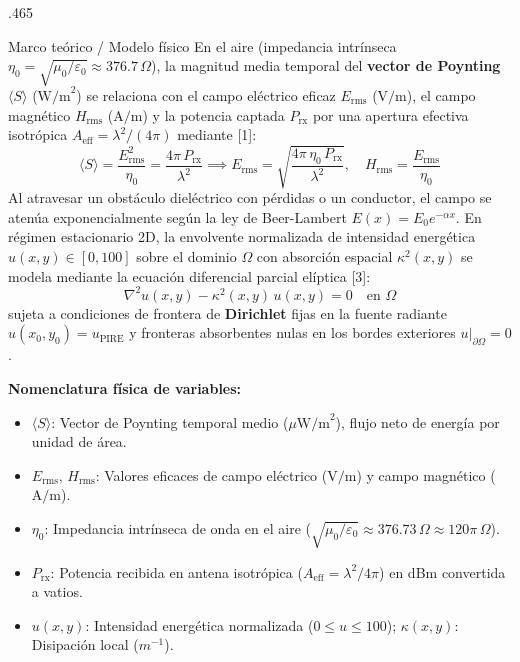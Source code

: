 \documentclass[final]{beamer}
\begin{document}
\begin{frame}[t]
\begin{columns}[t]
\begin{column}{.465\paperwidth}
				\begin{block}{Marco teórico / Modelo físico}
					En el aire (impedancia intrínseca \(\eta_0 = \sqrt{\mu_0/\varepsilon_0} \approx 376.7\,\Omega\)), la magnitud media temporal del \textbf{vector de Poynting} \(\langle S \rangle\) (\(\text{W/m}^2\)) se relaciona con el campo eléctrico eficaz \(E_{\text{rms}}\) (\(\text{V/m}\)), el campo magnético \(H_{\text{rms}}\) (\(\text{A/m}\)) y la potencia captada \(P_{\text{rx}}\) por una apertura efectiva isotrópica \(A_{\text{eff}} = \lambda^2/(4\pi)\) mediante [1]:
					\begin{equation}
						\langle S \rangle = \frac{E_{\text{rms}}^2}{\eta_0} = \frac{4\pi\,P_{\text{rx}}}{\lambda^2} \implies E_{\text{rms}} = \sqrt{\frac{4\pi\,\eta_0\,P_{\text{rx}}}{\lambda^2}}, \quad H_{\text{rms}} = \frac{E_{\text{rms}}}{\eta_0}
					\end{equation}
					Al atravesar un obstáculo dieléctrico con pérdidas o un conductor, el campo se atenúa exponencialmente según la ley de Beer-Lambert \(E(x) = E_0 e^{-\alpha x}\). En régimen estacionario 2D, la envolvente normalizada de intensidad energética \(u(x,y) \in [0, 100]\) sobre el dominio \(\Omega\) con absorción espacial \(\kappa^2(x,y)\) se modela mediante la ecuación diferencial parcial elíptica [3]:
					\begin{equation}
						\nabla^2 u(x,y) - \kappa^2(x,y)\,u(x,y) = 0 \quad \text{en } \Omega
					\end{equation}
					sujeta a condiciones de frontera de \textbf{Dirichlet} fijas en la fuente radiante \(u(x_0,y_0) = u_{\text{PIRE}}\) y fronteras absorbentes nulas en los bordes exteriores \(u|_{\partial\Omega} = 0\).
					
					\vspace{0.15cm}
					\textbf{Nomenclatura física de variables:}
					\begin{itemize}
						\item \(\langle S \rangle\): Vector de Poynting temporal medio (\(\mu\text{W/m}^2\)), flujo neto de energía por unidad de área.
						\item \(E_{\text{rms}},\, H_{\text{rms}}\): Valores eficaces de campo eléctrico (\(\text{V/m}\)) y campo magnético (\(\text{A/m}\)).
						\item \(\eta_0\): Impedancia intrínseca de onda en el aire (\(\sqrt{\mu_0/\varepsilon_0} \approx 376.73\,\Omega \approx 120\pi\,\Omega\)).
						\item \(P_{\text{rx}}\): Potencia recibida en antena isotrópica (\(A_{\text{eff}} = \lambda^2/4\pi\)) en dBm convertida a vatios.
						\item \(u(x,y)\): Intensidad energética normalizada (\(0 \le u \le 100\)); \(\kappa(x,y)\): Disipación local (\(m^{-1}\)).
					\end{itemize}
				\end{block}
				

\end{column}
\end{columns}
\end{frame}
\end{document}
